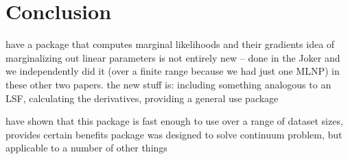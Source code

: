 \documentclass[manuscript]{aastex62}
\begin{document}
\section{Conclusion}
\label{sec:conclusion}
have a package that computes marginal likelihoods and their gradients
idea of marginalizing out linear parameters is not entirely new -- done in the Joker and we independently did it (over a finite range because we had just one MLNP) in these other two papers.
the new stuff is: including something analogous to an LSF, calculating the derivatives, providing a general use package

have shown that this package is fast enough to use over a range of dataset sizes, provides certain benefits
package was designed to solve continuum problem, but applicable to a number of other things


\acknowledgments



\end{document}
